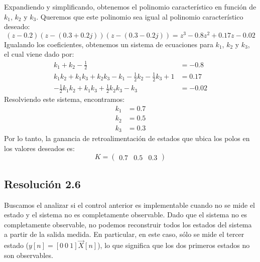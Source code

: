 \documentclass[
  11pt,
  letterpaper,
   addpoints,
   answers
  ]{exam}
\begin{document}
\begin{questions}
\begin{solution}
Expandiendo y simplificando, obtenemos el polinomio característico en función de $k_1$, $k_2$ y $k_3$. Queremos que este polinomio sea igual al polinomio característico deseado:
\begin{equation}
  (z - 0.2)(z - (0.3 + 0.2j))(z - (0.3 - 0.2j)) = z^3 - 0.8z^2 + 0.17z - 0.02
\end{equation}
Igualando los coeficientes, obtenemos un sistema de ecuaciones para $k_1$, $k_2$ y $k_3$, el cual viene dado por:
\begin{align}
  k_1 + k_2 - \frac{1}{2} &= -0.8 \\
  k_1 k_2 + k_1 k_3 + k_2 k_3 - k_1 - \frac{1}{2}k_2 - \frac{1}{2}k_3 + 1 &= 0.17 \\
  -\frac{1}{2}k_1 k_2 + k_1 k_3 + \frac{1}{2}k_2 k_3 - k_3 &= -0.02
\end{align}
Resolviendo este sistema, encontramos:
\begin{align}
  k_1 &= 0.7 \\
  k_2 &= 0.5 \\
  k_3 &= 0.3
\end{align}
Por lo tanto, la ganancia de retroalimentación de estados que ubica los polos en los valores deseados es:
\begin{equation}
  K = \begin{pmatrix} 0.7 & 0.5 & 0.3 \end{pmatrix}
\end{equation}
\subsection*{Resolución 2.6}
Buscamos el analizar si el control anterior es implementable cuando no se mide el estado y el sistema no es completamente observable. Dado que el sistema no es completamente observable, no podemos reconstruir todos los estados del sistema a partir de la salida medida. En particular, en este caso, sólo se mide el tercer estado ($y[n] = [0\ 0\ 1] \vec{X}[n]$), lo que significa que los dos primeros estados no son observables. 
\end{solution}
\end{questions}
\end{document}
